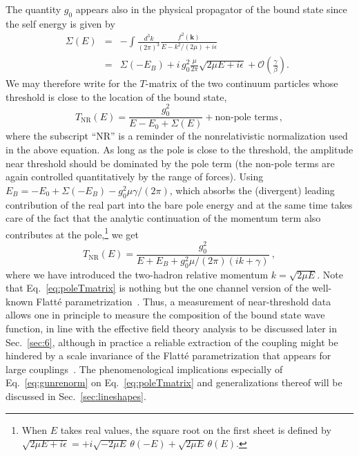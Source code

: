 The quantity $g_0$ appears also in the physical propagator of the bound state
since the self energy is given by 
\begin{eqnarray}\nonumber
\Sigma(E) &=& - \int \frac{d^3 k}{(2\pi)^3}
\frac{f^2(\bm k)}{E-k^2/(2\mu)+i\epsilon}
\\
&=& \Sigma(-E_B) + i\,g_0^2\frac{\mu}{2\pi}\sqrt{2\mu E+i\epsilon}  +
{\mathcal O}\left(\frac{\gamma}{\beta}\right)  .~~
\end{eqnarray}
We may therefore write for the $T$-matrix of the two continuum particles whose
threshold is close to the location of the bound state,
\begin{equation}
T_\text{NR}(E) = \frac{g_0^2}{E-E_0+\Sigma(E)} + \mbox{non-pole terms} \, ,
\end{equation}
where the subscript ``NR'' is a reminder of the nonrelativistic normalization
used in the above equation.
As long as the pole is close to the threshold, the amplitude near threshold 
should be dominated by the pole term (the non-pole terms are again controlled 
quantitatively by the range of forces). Using $ E_B = -E_0 + \Sigma(-E_B) - 
g_0^2\mu\gamma/(2\pi) $, which absorbs the (divergent) leading contribution of 
the real part into the bare pole energy and at the same
time takes care of the fact that the analytic continuation of the momentum term
also contributes at the pole,\footnote{When $E$ takes real values,
 the square root on the first sheet is defined by $\sqrt{2\mu E+i\epsilon} =
 +i\sqrt{-2\mu E}\, \theta(-E) + \sqrt{2\mu E}\,\theta(E) $.
 } we get
\begin{equation}
T_\text{NR}(E) = \frac{g_0^2}{E+E_B+g_0^2 \mu/(2\pi) (i k+\gamma)} \ ,
\label{eq:poleTmatrix}
\end{equation}
where we have introduced the two-hadron relative momentum $k=\sqrt{2\mu E}$.
Note that Eq.~\eqref{eq:poleTmatrix} is nothing but the one channel version of
the well-known Flatt\'e parametrization~\cite{Flatte:1976xu}.
  Thus, a measurement of near-threshold data allows one in principle to measure
 the composition of the bound state wave function, in line with the effective
 field theory analysis to be discussed later in Sec.~\ref{sec:6}, although in
 practice a reliable extraction of the coupling might be hindered by a scale invariance of the
 Flatt\'e parametrization that appears for large couplings~\cite{Baru:2004xg}.
 The phenomenological implications especially of Eq.~\eqref{eq:gunrenorm} on
 Eq.~\eqref{eq:poleTmatrix} and generalizations thereof will be discussed in
 Sec.~\ref{sec:lineshapes}.


